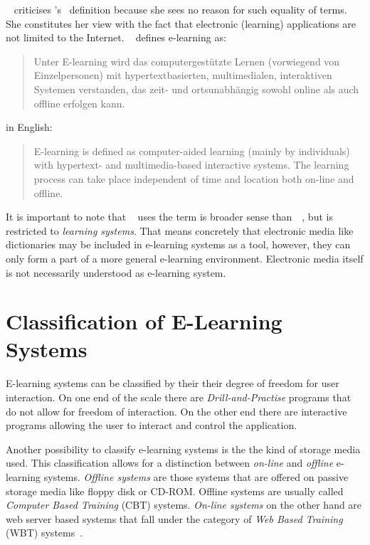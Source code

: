 ~\citeyear{Richert2007} criticises 
's~\citeyear{Rosenberg2006} definition because she 
sees no reason for such equality of terms. She constitutes her view with the 
fact that electronic (learning) applications are not limited to the Internet. 
~\citeyear{Richert2007} defines e-learning as:
  \begin{quote}
    Unter E-learning wird das computergestützte Lernen (vorwiegend von 
    Einzelpersonen) mit hypertextbasierten, multimedialen, interaktiven 
    Systemen verstanden, das zeit- und ortsunabhängig sowohl online als 
    auch offline erfolgen kann.
  \end{quote}
in English:
  \begin{quote}
    E-learning is defined as computer-aided learning (mainly by individuals)
    with hypertext- and multimedia-based interactive systems. The learning
    process can take place independent of time and location both on-line and 
    offline.
  \end{quote}
It is important to note that 
~\citeyear{Richert2007}
uses the term is broader sense 
than~~\citeyear{Rosenberg2006},
but is restricted to \emph{learning systems}.
That means concretely that electronic media like dictionaries may be included
in e-learning systems as a tool, however, they can only form a part of a 
more general e-learning environment. Electronic media itself is not necessarily
understood as e-learning system.


\section{Classification of E-Learning Systems} %
\label{sec:elearn:classification}

E-learning systems can be classified by their their degree of freedom for 
user interaction. On one end of the scale there are \emph{Drill-and-Practise} 
programs that do not allow for freedom of interaction. On the other end there 
are interactive programs allowing the user to interact and control the 
application.

Another possibility to classify e-learning systems is the the kind of storage
media used. This classification allows for a distinction between \emph{on-line} 
and \emph{offline} e-learning systems. \emph{Offline systems} are those systems
that are offered on passive storage media like floppy disk or CD-ROM.
Offline systems are usually called \emph{Computer Based Training} (CBT) systems.
\emph{On-line systems} on the other hand are web server based systems that fall
under the category of \emph{Web Based Training} (WBT) 
systems~.

